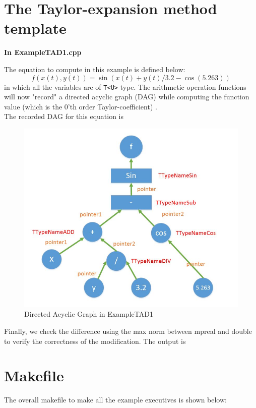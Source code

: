 \section{The Taylor-expansion method template }
{\textbf{In ExampleTAD1.cpp}}

\newpage
The equation to compute in this example is defined below:
$$f(x(t),y(t))=\sin(x(t) + y(t) / 3.2 - \cos(5.263))$$
in which all the variables are of \texttt{T<U>} type. The arithmetic operation functions will now "record" a directed acyclic graph (DAG) while computing the function value (which is the 0'th order Taylor-coefficient) \cite{IntroAl}. \\
The recorded DAG for this equation is
\begin{figure}[H]
	\centering
	\includegraphics[scale=0.55]{images/DAG2}
	\caption{Directed Acyclic Graph in ExampleTAD1}
\end{figure}
Finally, we check the difference using the max norm between mpreal and double to verify the correctness of the modification. The output is
\newpage

%
%
\newpage
\section{Makefile}
The overall makefile to make all the example executives is shown below:
